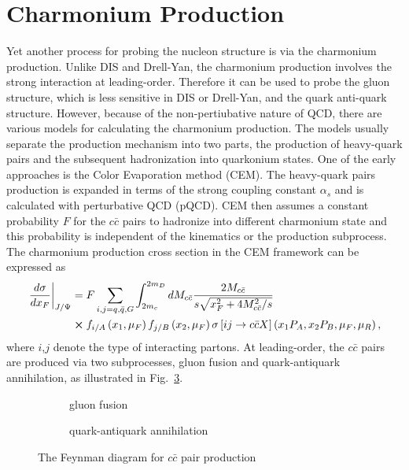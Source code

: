 \documentclass[../main.tex]{subfiles}
\begin{document}
\section{Charmonium Production}
\label{sec:jpsi}
Yet another process for probing the nucleon structure is via the charmonium production\cite{peng1995,chang2020}.
Unlike DIS and Drell-Yan, the charmonium production involves the strong interaction
at leading-order. Therefore it can be used to probe the gluon structure, which is 
less sensitive in DIS or Drell-Yan, and the quark anti-quark structure. However, 
because of the non-pertiubative nature of QCD, there are various models for 
calculating the charmonium production. The models usually separate the production
mechanism into two parts, the production of heavy-quark pairs and the subsequent
hadronization into quarkonium states. One of the early approaches is the Color 
Evaporation method (CEM)\cite{einhorn1975,bodwin1995,bodwin1997}. The heavy-quark 
pairs production is expanded in terms of the strong coupling constant $\alpha_s$
and is calculated with perturbative QCD (pQCD). CEM then assumes a constant 
probability $F$ for the $c\bar{c}$ pairs to hadronize into different charmonium
state and this probability is independent of the kinematics or the production
subprocess. The charmonium production cross section in the CEM framework can be 
expressed as
\begin{equation}
    \begin{split}
        \left.\frac{d\sigma}{dx_F}\right|_{J/\Psi} &= F \sum_{i,j = q,\bar{q},G}\int^{2m_D}_{2m_c} dM_{c\bar{c}}  \frac{2M_{c\bar{c}}}{s\sqrt{x_F^2+4M_{c\bar{c}}^2/s}}\\
        &\cross f_{i/A}\left(x_1,\mu_F\right)f_{j/B}\left(x_2,\mu_F\right)\sigma\left[ij\rightarrow c\bar{c}X\right]\left(x_1P_A,x_2P_B,\mu_F,\mu_R \right),
    \end{split}
\end{equation}
where $i$,$j$ denote the type of interacting partons. At leading-order, the 
$c\bar{c}$ pairs are produced via two subprocesses, gluon fusion and 
quark-antiquark annihilation, as illustrated in Fig.\ \ref{fig:charmonium}.
\begin{figure}[htpb!]
    \centering
    \begin{subfigure}{0.4\linewidth}
        \begin{subfigure}{\linewidth}
        
        \end{subfigure}
        \begin{subfigure}{\linewidth}
        
        \end{subfigure}
        \caption{gluon fusion\label{subfig:gluon}}
    \end{subfigure}
    \quad
    \begin{subfigure}{0.4\linewidth}
    
    \caption{quark-antiquark annihilation\label{subfig:qqbar}}
    \end{subfigure}
    \caption{The Feynman diagram for $c\bar{c}$ pair production}
    \label{fig:charmonium}
\end{figure}
\end{document}
